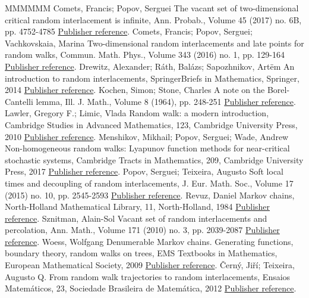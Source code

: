 \begin{thebibliography}{MMMMMM}
 Comets, Francis; Popov, Serguei The vacant set of two-dimensional critical random interlacement is infinite, Ann. Probab., Volume 45 (2017) no. 6B, pp. 4752-4785 \href{https://ahl.centre-mersenne.org/item/AHL_2019__2__349_0/#CP16}{Publisher reference}.
 Comets, Francis; Popov, Serguei; Vachkovskaia, Marina Two-dimensional random interlacements and late points for random walks, Commun. Math. Phys., Volume 343 (2016) no. 1, pp. 129-164 \href{https://ahl.centre-mersenne.org/item/AHL_2019__2__349_0/#CPV16}{Publisher reference}.
 Drewitz, Alexander; Ráth, Balázs; Sapozhnikov, Artëm An introduction to random interlacements, SpringerBriefs in Mathematics, Springer, 2014 \href{https://ahl.centre-mersenne.org/item/AHL_2019__2__349_0/#DRS14}{Publisher reference}.
 Kochen, Simon; Stone, Charles A note on the Borel-Cantelli lemma, Ill. J. Math., Volume 8 (1964), pp. 248-251 \href{https://ahl.centre-mersenne.org/item/AHL_2019__2__349_0/#KS64}{Publisher reference}.
 Lawler, Gregory F.; Limic, Vlada Random walk: a modern introduction, Cambridge Studies in Advanced Mathematics, 123, Cambridge University Press, 2010 \href{https://ahl.centre-mersenne.org/item/AHL_2019__2__349_0/#LL10}{Publisher reference}.
 Menshikov, Mikhail; Popov, Serguei; Wade, Andrew Non-homogeneous random walks: Lyapunov function methods for near-critical stochastic systems, Cambridge Tracts in Mathematics, 209, Cambridge University Press, 2017 \href{https://ahl.centre-mersenne.org/item/AHL_2019__2__349_0/#MPW17}{Publisher reference}.
 Popov, Serguei; Teixeira, Augusto Soft local times and decoupling of random interlacements, J. Eur. Math. Soc., Volume 17 (2015) no. 10, pp. 2545-2593 \href{https://ahl.centre-mersenne.org/item/AHL_2019__2__349_0/#SLT}{Publisher reference}.
 Revuz, Daniel Markov chains, North-Holland Mathematical Library, 11, North-Holland, 1984 \href{https://ahl.centre-mersenne.org/item/AHL_2019__2__349_0/#R84}{Publisher reference}.
 Sznitman, Alain-Sol Vacant set of random interlacements and percolation, Ann. Math., Volume 171 (2010) no. 3, pp. 2039-2087 \href{https://ahl.centre-mersenne.org/item/AHL_2019__2__349_0/#Szn10}{Publisher reference}.
 Woess, Wolfgang Denumerable Markov chains. Generating functions, boundary theory, random walks on trees, EMS Textbooks in Mathematics, European Mathematical Society, 2009 \href{https://ahl.centre-mersenne.org/item/AHL_2019__2__349_0/#Woess09}{Publisher reference}.
 Černý, Jiří; Teixeira, Augusto Q. From random walk trajectories to random interlacements, Ensaios Matemáticos, 23, Sociedade Brasileira de Matemática, 2012 \href{https://ahl.centre-mersenne.org/item/AHL_2019__2__349_0/#CT12}{Publisher reference}.
\end{thebibliography}
